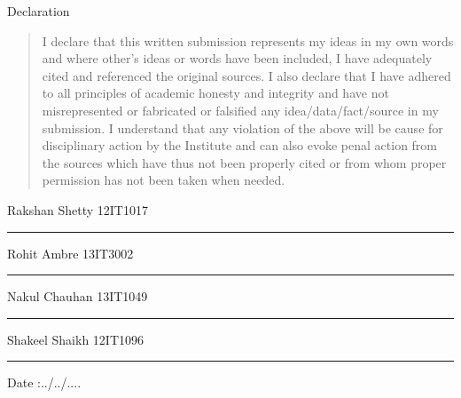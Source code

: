 
\newpage
\begin{center}
\huge Declaration
\end{center}

\vspace{0.5in}
\begin{quote}
I declare that this written submission represents my ideas in my own words and where other’s ideas or words have been included, I have adequately cited and referenced the original sources. I also declare that I have adhered to all principles of academic honesty and integrity and have not misrepresented or fabricated or falsified any idea/data/fact/source in my submission. I understand that any violation of the above will be cause for disciplinary action by the Institute and can also evoke penal action from the sources which have thus not been properly cited or from whom proper permission has not been taken when needed.
\end{quote}
\vspace{1.5in}

\hspace{6.5cm}Rakshan Shetty \hspace{0.2cm} 12IT1017 \hspace{0.2cm} \rule{2cm}{0.5pt}
\vspace{0.1in}

\hspace{6.5cm}Rohit Ambre \hspace{0.6cm} 13IT3002 \hspace{0.2cm} \rule{2cm}{0.5pt}
\vspace{0.1in}

\hspace{6.5cm}Nakul Chauhan \hspace{0.2cm} 13IT1049 \hspace{0.2cm} \rule{2cm}{0.5pt}
\vspace{0.1in}

\hspace{6.5cm}Shakeel Shaikh \hspace{0.2cm} 12IT1096 \hspace{0.2cm} \rule{2cm}{0.5pt}

\vspace{0.2in}
\begin{flushleft}
  Date :../../....
\end{flushleft}
